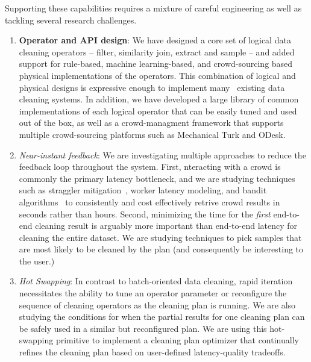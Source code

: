 Supporting these capabilities requires a mixture of careful engineering as well as tackling several research challenges.

\begin{enumerate}
\item {\bf Operator and API design}: We have designed a core set of logical data cleaning operators --
filter, similarity join, extract and sample -- and added support for rule-based, machine learning-based, and 
crowd-sourcing based physical implementations of the operators.  
This combination of logical and physical designs is expressive enough to implement many~\cite{gokhale2014corleone,stonebraker2013data} 
existing data cleaning systems.  
In addition, we have developed a large library of common implementations of 
each logical operator that can be easily tuned and used out of the box, as well as a crowd-managment 
framework that supports multiple crowd-sourcing platforms such as Mechanical Turk and ODesk.

\item {\it Near-instant feedback}: We are investigating multiple approaches to reduce the 
feedback loop throughout the system.  First, nteracting with a crowd is commonly the primary latency bottleneck,
and we are studying techniques such as straggler mitigation~\cite{venkataraman2014power}, worker latency modeling, and
bandit algorithms~\cite{} to consistently and cost effectively retrive crowd results in seconds rather than hours. 
Second, minimizing the time for the {\it first} end-to-end cleaning result is arguably more important than 
end-to-end latency for cleaning the entire dataset.    We are studying techniques to pick samples that are
most likely to be cleaned by the plan (and consequently be interesting to the user.)

\item {\it Hot Swapping}: In contrast to batch-oriented data cleaning, rapid iteration necessitates the
ability to tune an operator parameter or reconfigure the sequence of cleaning operators as the cleaning
plan is running.   We are also studying the conditions for when the partial results for one
cleaning plan can be safely used in a similar but reconfigured plan.  We are using this hot-swapping primitive
to implement a cleaning plan optimizer that continually refines the cleaning plan based on user-defined latency-quality
tradeoffs.

\end{enumerate}


